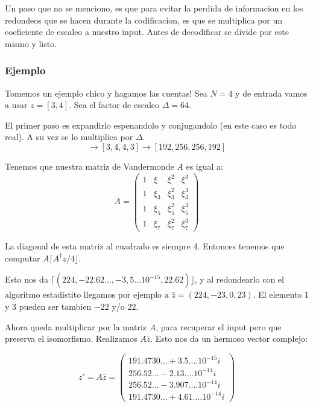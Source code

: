 \documentclass[12pt, oneside]{article}
\begin{document}
Un paso que no se menciono, es que para evitar la perdida de informacion en los redondeos
que se hacen durante la codificacion, es que se multiplica por un coeficiente de
escaleo a nuestro input.
Antes de decodificar se divide por este mismo y listo.


\subsubsection{Ejemplo}

Tomemos un ejemplo chico y hagamos las cuentas!
Sea $N=4$ y de entrada vamos a usar $z=[3,4]$.
Sea el factor de escaleo $\Delta=64$.

El primer paso es expandirlo espenandolo y conjugandolo (en este caso es todo real).
A su vez se lo multiplica por  $\Delta$.
\begin{equation*}
    [3,4]\rightarrow [3,4,4,3] \rightarrow [192, 256, 256, 192]
\end{equation*}

Tenemos que nuestra matriz de Vandermonde $A$ es igual a:
\begin{equation*}
    A=
    \begin{pmatrix}
        1 & \xi &  \xi^2 &  \xi^3 \\
        1 & \xi_3 & \xi_3^2 &\xi_3^3\\
        1 & \xi_5 & \xi_5^2 &\xi_5^3\\
        1 & \xi_7 & \xi_7^2 &\xi_7^3
    \end{pmatrix}
    \label{eq:vandermonde_ej}
\end{equation*}

La diagonal de esta matriz al cuadrado es siempre 4.
Entonces tenemos que computar $A\lceil A^\dagger z/4  \rfloor$.

Esto nos da $\lceil(224, -22.62..., -3,5...10^{-15}, 22.62)\rfloor$, y al redondearlo
con el algoritmo estadistito llegamos por ejemplo a $\hat{z}=(224, -23, 0, 23)$.
El elemento 1 y 3 pueden ser tambien $-22$ y/o $22$.


Ahora queda multiplicar por la matriz $A$, para recuperar el input pero que preserva
el isomorfismo.
Realizamos $A\hat{z}$.
Esto nos da un hermoso vector complejo:

\begin{equation*}
    z'= A\hat{z}=
    \begin{pmatrix}
        191.4730... + 3.5....10^{-15}i \\
        256.52... - 2.13....10^{-14}i \\
        256.52... - 3.907....10^{-14}i \\
        191.4730... + 4.61....10^{-14}i
    \end{pmatrix}
    \label{eq:vandermonde_ej}
\end{equation*}
\end{document}
